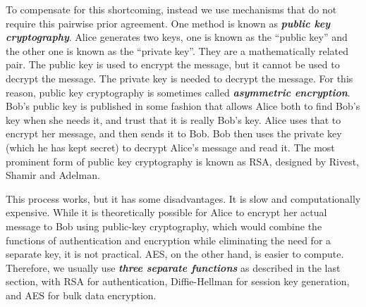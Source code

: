 To compensate for this shortcoming, instead we use mechanisms that do not require this pairwise prior agreement.
One method is known as \textbf{\emph{public key cryptography}}.
Alice generates two keys, one is known as the ``public key'' and the other one is known as the ``private key''. 
They are a mathematically related pair.
The public key is used to encrypt the message, but it cannot be used to decrypt the message. 
The private key is needed to decrypt the message.
For this reason, public key cryptography is sometimes called \textbf{\emph{asymmetric encryption}}.
Bob's public key is published in some fashion that allows Alice both to find Bob's key when she needs it, and trust that it is really Bob's key.
Alice uses that to encrypt her message, and then sends it to Bob.
Bob then uses the private key (which he has kept secret) to decrypt Alice's message and read it.
The most prominent form of public key cryptography is known as RSA, designed by Rivest, Shamir and Adelman.

This process works, but it has some disadvantages.
It is slow and computationally expensive.
While it is theoretically possible for Alice to encrypt her actual message to Bob using public-key cryptography, which would combine the functions of authentication and encryption while eliminating the need for a separate key, it is not practical. 
AES, on the other hand, is easier to compute.
Therefore, we usually use \textbf{\emph{three separate functions}} as described in the last section, with RSA for authentication, Diffie-Hellman for session key generation, and AES for bulk data encryption.

